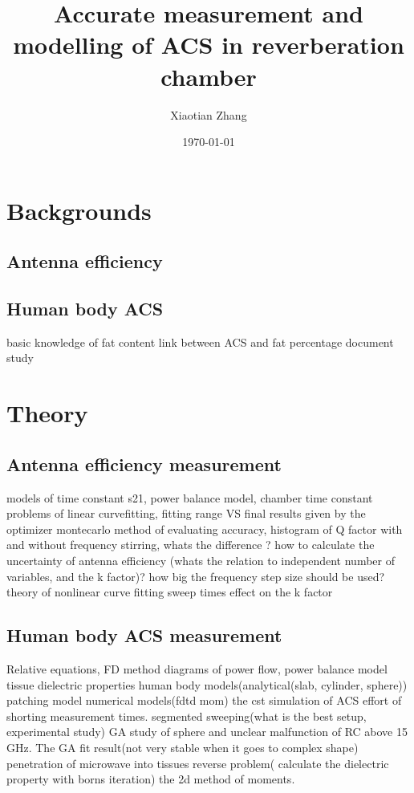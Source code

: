 \documentclass{article}
\title{Accurate measurement and modelling of ACS in reverberation chamber}
\date{\today}
\author{Xiaotian Zhang}
\begin{document}
\maketitle
\newpage
{}

\section{Backgrounds}
\subsection{Antenna efficiency}
\subsection{Human body ACS}
basic knowledge of fat content
link between ACS and fat percentage
document study

\section{Theory}
\subsection{Antenna efficiency measurement}


models of time constant
s21, power balance model, chamber time constant
problems of linear curvefitting, fitting range VS final results given by the optimizer
montecarlo method of evaluating accuracy, histogram of Q factor
with and without frequency stirring, whats the difference ?
how to calculate
the uncertainty of antenna efficiency (whats the relation to independent number
of variables, and the k factor)?
how big the frequency step size should be used?
theory of nonlinear curve fitting
sweep times effect on the k factor


\subsection{Human body ACS measurement}
Relative equations, FD method
diagrams of power flow, power balance model
tissue dielectric properties
human body models(analytical(slab, cylinder, sphere))
patching model
numerical models(fdtd mom)
the cst simulation of ACS
effort of shorting measurement times.
segmented sweeping(what is the best setup, experimental study)
GA study of sphere and unclear malfunction of RC above 15 GHz.
The GA fit result(not very stable when it goes to complex shape)
penetration of microwave into tissues
reverse problem( calculate the dielectric property with borns iteration)
the 2d method of moments.
\end{document}
